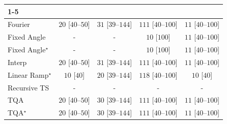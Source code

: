 \begin{tabular}{l|cccc|}
\cline{1-5}
\multicolumn{5}{c}{\rule{0pt}{8pt}PP} \\
\midrule
Fourier & {\cellcolor[HTML]{F5FBF2}} \color[HTML]{000000} $20$ [$40$--$50$] & {\cellcolor[HTML]{F2FAF0}} \color[HTML]{000000} $31$ [$39$--$144$] & {\cellcolor[HTML]{DEF2D9}} \color[HTML]{000000} $111$ [$40$--$100$] & {\cellcolor[HTML]{F7FCF5}} \color[HTML]{000000} $11$ [$40$--$100$] \\
Fixed Angle & {\cellcolor[HTML]{000000}} \color[HTML]{F1F1F1} {\cellcolor{white}} \color{black} - & {\cellcolor[HTML]{000000}} \color[HTML]{F1F1F1} {\cellcolor{white}} \color{black} - & {\cellcolor[HTML]{F7FCF5}} \color[HTML]{000000} $10$ [$100$] & {\cellcolor[HTML]{F7FCF5}} \color[HTML]{000000} $11$ [$40$--$100$] \\
Fixed Angle$^\star$ & {\cellcolor[HTML]{000000}} \color[HTML]{F1F1F1} {\cellcolor{white}} \color{black} - & {\cellcolor[HTML]{000000}} \color[HTML]{F1F1F1} {\cellcolor{white}} \color{black} - & {\cellcolor[HTML]{F7FCF5}} \color[HTML]{000000} $10$ [$100$] & {\cellcolor[HTML]{F7FCF5}} \color[HTML]{000000} $11$ [$40$--$100$] \\
Interp & {\cellcolor[HTML]{F5FBF2}} \color[HTML]{000000} $20$ [$40$--$50$] & {\cellcolor[HTML]{F2FAF0}} \color[HTML]{000000} $31$ [$39$--$144$] & {\cellcolor[HTML]{DEF2D9}} \color[HTML]{000000} $111$ [$40$--$100$] & {\cellcolor[HTML]{F7FCF5}} \color[HTML]{000000} $11$ [$40$--$100$] \\
Linear Ramp$^\star$ & {\cellcolor[HTML]{F7FCF5}} \color[HTML]{000000} $10$ [$40$] & {\cellcolor[HTML]{F5FBF2}} \color[HTML]{000000} $20$ [$39$--$144$] & {\cellcolor[HTML]{DBF1D6}} \color[HTML]{000000} $118$ [$40$--$100$] & {\cellcolor[HTML]{F7FCF5}} \color[HTML]{000000} $10$ [$40$] \\
Recursive TS & {\cellcolor[HTML]{000000}} \color[HTML]{F1F1F1} {\cellcolor{white}} \color{black} - & {\cellcolor[HTML]{000000}} \color[HTML]{F1F1F1} {\cellcolor{white}} \color{black} - & {\cellcolor[HTML]{000000}} \color[HTML]{F1F1F1} {\cellcolor{white}} \color{black} - & {\cellcolor[HTML]{000000}} \color[HTML]{F1F1F1} {\cellcolor{white}} \color{black} - \\
TQA & {\cellcolor[HTML]{F5FBF2}} \color[HTML]{000000} $20$ [$40$--$50$] & {\cellcolor[HTML]{F2FAF0}} \color[HTML]{000000} $30$ [$39$--$144$] & {\cellcolor[HTML]{DEF2D9}} \color[HTML]{000000} $111$ [$40$--$100$] & {\cellcolor[HTML]{F7FCF5}} \color[HTML]{000000} $11$ [$40$--$100$] \\
TQA$^\star$ & {\cellcolor[HTML]{F5FBF2}} \color[HTML]{000000} $20$ [$40$--$50$] & {\cellcolor[HTML]{F2FAF0}} \color[HTML]{000000} $30$ [$39$--$144$] & {\cellcolor[HTML]{DEF2D9}} \color[HTML]{000000} $111$ [$40$--$100$] & {\cellcolor[HTML]{F7FCF5}} \color[HTML]{000000} $11$ [$40$--$100$] \\

\end{tabular}
